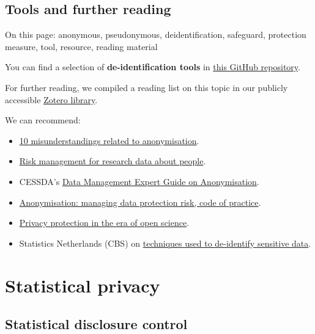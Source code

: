 \documentclass[
]{book}
\providecommand{\tightlist}{%
  \setlength{\itemsep}{0pt}\setlength{\parskip}{0pt}}
\begin{document}
\hypertarget{deidentification-resources}{%
\section{Tools and further reading}\label{deidentification-resources}}

On this page: anonymous, pseudonymous, deidentification, safeguard, protection
measure, tool, resource, reading material

You can find a selection of \textbf{de-identification tools} in
\href{https://github.com/UtrechtUniversity/privacy-engineering-tools/tree/main/deidentification}{this GitHub repository}.

For further reading, we compiled a reading list on this topic in our publicly
accessible \href{https://www.zotero.org/groups/2554340/data_privacy_uu/collections/6HS9MPBR}{Zotero library}.

We can recommend:

\begin{itemize}
\tightlist
\item
  \href{https://edps.europa.eu/system/files/2021-04/21-04-27_aepd-edps_anonymisation_en_5.pdf}{10 misunderstandings related to anonymisation}.
\item
  \href{https://doi.org/10.5281/zenodo.3584332}{Risk management for research data about people}.
\item
  CESSDA's \href{https://dmeg.cessda.eu/Data-Management-Expert-Guide/5.-Protect/Anonymisation}{Data Management Expert Guide on Anonymisation}.
\item
  \href{https://ico.org.uk/media/1061/anonymisation-code.pdf}{Anonymisation: managing data protection risk, code of practice}.
\item
  \href{https://doi.org/10.31234/osf.io/ybzu9}{Privacy protection in the era of open science}.
\item
  Statistics Netherlands (CBS) on
  \href{https://www.cbs.nl/en-gb/our-services/methods/statistical-methods/output/statistical-disclosure-control}{techniques used to de-identify sensitive data}.
\end{itemize}

\hypertarget{statistical-privacy}{%
\chapter{Statistical privacy}\label{statistical-privacy}}

\hypertarget{sdc}{%
\section{Statistical disclosure control}\label{sdc}}
\end{document}
